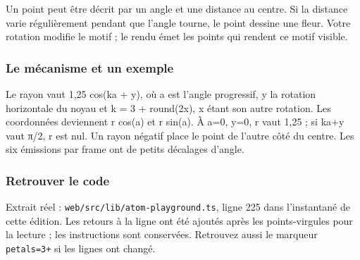 \documentclass[
  canadien,
  11pt,
  letterpaper,
]{article}
\begin{document}
Un point peut être décrit par un angle et une distance au centre. Si la
distance varie régulièrement pendant que l'angle tourne, le point
dessine une fleur. Votre rotation modifie le motif ; le rendu émet les
points qui rendent ce motif visible.

\subsubsection{Le mécanisme et un
exemple}\label{le-muxe9canisme-et-un-exemple-8}

Le rayon vaut 1,25 cos(ka + y), où a est l'angle progressif, y la
rotation horizontale du noyau et k = 3 + round(2\textbar x\textbar), x
étant son autre rotation. Les coordonnées deviennent r cos(a) et r
sin(a). À a=0, y=0, r vaut 1,25 ; si ka+y vaut π/2, r est nul. Un rayon
négatif place le point de l'autre côté du centre. Les six émissions par
frame ont de petits décalages d'angle.

\subsubsection{Retrouver le code}\label{retrouver-le-code-8}

Extrait réel : \texttt{web/src/lib/atom-playground.ts}, ligne 225 dans
l'instantané de cette édition. Les retours à la ligne ont été ajoutés
après les points-virgules pour la lecture ; les instructions sont
conservées. Retrouvez aussi le marqueur \texttt{petals=3+} si les lignes
ont changé.
\end{document}
